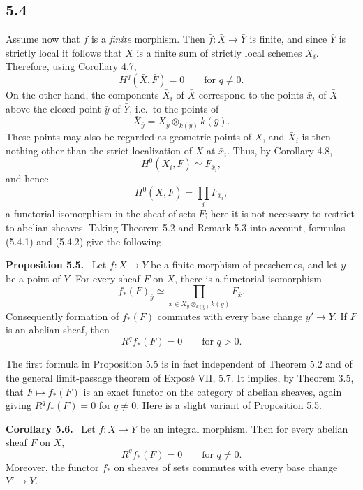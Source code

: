 \documentclass[11pt]{article}
\newcommand{\ie}{i.e.\ }
\newenvironment{statement}[1]{\par\medskip\noindent\textbf{#1.}\ }{\par\medskip}
\begin{document}
\subsection*{5.4}
Assume now that \(f\) is a \emph{finite} morphism. Then \(\bar f:\bar X\to\bar Y\) is finite, and since \(\bar Y\) is strictly local it follows that \(\bar X\) is a finite sum of strictly local schemes \(\bar X_i\). Therefore, using Corollary 4.7,
\[
H^q(\bar X,\bar F)=0\qquad\text{for }q\ne 0.
\tag{5.4.1}
\]
On the other hand, the components \(\bar X_i\) of \(\bar X\) correspond to the points \(\bar x_i\) of \(\bar X\) above the closed point \(\bar y\) of \(\bar Y\), \ie to the points of
\[
\bar X_{\bar y}=X_y\otimes_{k(y)}k(\bar y).
\]
These points may also be regarded as geometric points of \(X\), and \(\bar X_i\) is then nothing other than the strict localization of \(X\) at \(\bar x_i\). Thus, by Corollary 4.8,
\[
H^0(\bar X_i,\bar F)\simeq F_{\bar x_i},
\]
and hence
\[
H^0(\bar X,\bar F)=\prod_i F_{\bar x_i},
\tag{5.4.2}
\]
a functorial isomorphism in the sheaf of sets \(F\); here it is not necessary to restrict to abelian sheaves. Taking Theorem 5.2 and Remark 5.3 into account, formulas (5.4.1) and (5.4.2) give the following.

\begin{statement}{Proposition 5.5}
Let \(f:X\to Y\) be a finite morphism of preschemes, and let \(y\) be a point of \(Y\). For every sheaf \(F\) on \(X\), there is a functorial isomorphism
\[
f_*(F)_{\bar y}\simeq \prod_{\bar x\in X_y\otimes_{k(y)}k(\bar y)}F_{\bar x}.
\]
Consequently formation of \(f_*(F)\) commutes with every base change \(y'\to Y\). If \(F\) is an abelian sheaf, then
\[
R^qf_*(F)=0\qquad\text{for }q>0.
\]
\end{statement}

The first formula in Proposition 5.5 is in fact independent of Theorem 5.2 and of the general limit-passage theorem of Expos\'e VII, 5.7. It implies, by Theorem 3.5, that \(F\mapsto f_*(F)\) is an exact functor on the category of abelian sheaves, again giving \(R^qf_*(F)=0\) for \(q\ne 0\). Here is a slight variant of Proposition 5.5.

\begin{statement}{Corollary 5.6}
Let \(f:X\to Y\) be an integral morphism. Then for every abelian sheaf \(F\) on \(X\),
\[
R^qf_*(F)=0\qquad\text{for }q\ne 0.
\]
Moreover, the functor \(f_*\) on sheaves of sets commutes with every base change \(Y'\to Y\).
\end{statement}
\end{document}
